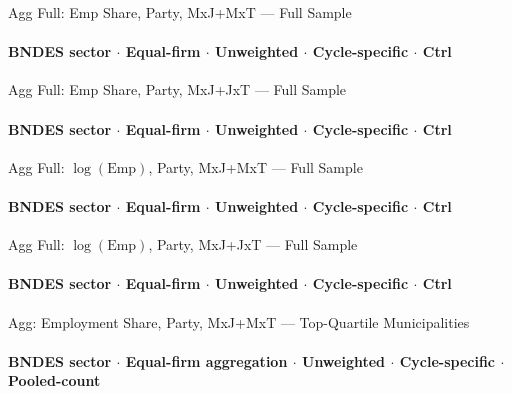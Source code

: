 \documentclass[aspectratio=169,10pt]{beamer}
\newcommand{\tbndes}{../tables/agg_firm_bndes_sector}
\begin{document}
\begin{frame}[t,shrink=12]{Agg Full: Emp Share, Party, MxJ+MxT --- Full Sample}
\framesubtitle{BNDES sector $\cdot$ Equal-firm $\cdot$ Unweighted $\cdot$ Cycle-specific $\cdot$ Ctrl}
\begin{center}\footnotesize

\end{center}
\end{frame}

\begin{frame}[t,shrink=12]{Agg Full: Emp Share, Party, MxJ+JxT --- Full Sample}
\framesubtitle{BNDES sector $\cdot$ Equal-firm $\cdot$ Unweighted $\cdot$ Cycle-specific $\cdot$ Ctrl}
\begin{center}\footnotesize

\end{center}
\end{frame}

\begin{frame}[t,shrink=12]{Agg Full: $\log(\text{Emp})$, Party, MxJ+MxT --- Full Sample}
\framesubtitle{BNDES sector $\cdot$ Equal-firm $\cdot$ Unweighted $\cdot$ Cycle-specific $\cdot$ Ctrl}
\begin{center}\footnotesize

\end{center}
\end{frame}

\begin{frame}[t,shrink=12]{Agg Full: $\log(\text{Emp})$, Party, MxJ+JxT --- Full Sample}
\framesubtitle{BNDES sector $\cdot$ Equal-firm $\cdot$ Unweighted $\cdot$ Cycle-specific $\cdot$ Ctrl}
\begin{center}\footnotesize

\end{center}
\end{frame}


\begin{frame}[t,shrink=12]{Agg: Employment Share, Party, MxJ+MxT --- Top-Quartile Municipalities}
\framesubtitle{BNDES sector $\cdot$ Equal-firm aggregation $\cdot$ Unweighted $\cdot$ Cycle-specific $\cdot$ Pooled-count}
\begin{center}\footnotesize

\end{center}
\end{frame}
\end{document}
